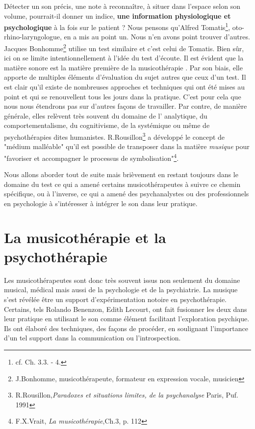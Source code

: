  Détecter un son précis, une note à reconnaître,  à situer dans l'espace selon son volume,  pourrait-il donner   un indice, \textbf{une information physiologique et psychologique} à la fois sur le patient ? Nous pensons qu'Alfred Tomatis\footnote{cf. Ch. 3.3. - 4.}, oto-rhino-laryngologue, en a mis au point un. Nous n'en avons point trouver d'autres. Jacques Bonhomme\footnote{J.Bonhomme, musicothérapeute, formateur en expression vocale, musicien} utilise un test similaire et c'est celui de Tomatis. 
 Bien sûr, ici on se limite intentionnellement à l'idée du test d'écoute. Il est évident que la matière sonore est la matière première de la  musicothérapie . Par son biais, elle  apporte de multiples éléments d'évaluation du sujet  autres que ceux d'un test. Il est clair qu'il existe de nombreuses approches et techniques qui ont été mises au point  et qui se renouvellent tous les jours dans la pratique.
 C'est pour cela que nous nous étendrons pas sur d'autres façons de travailler. Par contre, de manière générale, elles relèvent très souvent du domaine de l' analytique, du comportementalisme, du cognitivisme, de la  systémique ou même de psychothérapies dites humanistes.  R.Rousillon\footnote{R.Rousillon,\textit{Paradoxes et situations limites,  de la psychanalyse} Paris, Puf. 1991} a développé le concept de "médium malléable" qu'il est possible de transposer dans la matière \textit{musique} pour "favoriser et accompagner le processus de symbolisation"\footnote{F.X.Vrait, \textit{La musicothérapie},Ch.3, p. 112}.
 
 
 Nous allons aborder tout de suite mais brièvement en restant toujours dans le domaine du test ce qui a amené certains musicothérapeutes à suivre ce chemin spécifique, ou à  l'inverse, ce qui a amené des psychanalystes ou des professionnels en psychologie à s'intéresser à intégrer le son dans leur pratique.
 
 
 
\section{La musicothérapie et la psychothérapie}
\label{musicothEtpsycho}

	 Les musicothérapeutes sont donc très souvent  issus non seulement du domaine musical, médical mais aussi  de  la psychologie et de la psychiatrie. La musique s'est révélée être  un support d'expérimentation notoire en psychothérapie. Certains, tels Rolando Benenzon, Edith Lecourt,  ont fait fusionner les deux dans leur pratique  en utilisant le son comme élément facilitant l'exploration psychique. Ils ont élaboré des techniques, des façons de procéder, en soulignant l'importance d'un tel support dans la  communication ou l'introspection.
	 
